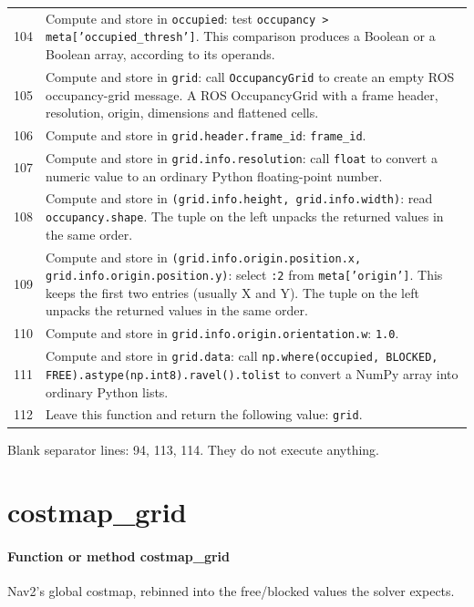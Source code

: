 \documentclass[11pt,a4paper]{book}
\begin{document}
\begin{longtable}{r p{}}
104 & Compute and store in \texttt{occupied}: test \texttt{occupancy > meta['occupied\_thresh']}. This comparison produces a Boolean or a Boolean array, according to its operands.  \\

105 & Compute and store in \texttt{grid}: call \texttt{OccupancyGrid} to create an empty ROS occupancy-grid message. A ROS OccupancyGrid with a frame header, resolution, origin, dimensions and flattened cells. \\

106 & Compute and store in \texttt{grid.header.frame\_id}: \texttt{frame\_id}.  \\

107 & Compute and store in \texttt{grid.info.resolution}: call \texttt{float} to convert a numeric value to an ordinary Python floating-point number.  \\

108 & Compute and store in \texttt{(grid.info.height, grid.info.width)}: read \texttt{occupancy.shape}. The tuple on the left unpacks the returned values in the same order. \\

109 & Compute and store in \texttt{(grid.info.origin.position.x, grid.info.origin.position.y)}: select \texttt{:2} from \texttt{meta['origin']}. This keeps the first two entries (usually X and Y). The tuple on the left unpacks the returned values in the same order. \\

110 & Compute and store in \texttt{grid.info.origin.orientation.w}: \texttt{1.0}.  \\

111 & Compute and store in \texttt{grid.data}: call \texttt{np.where(occupied, BLOCKED, FREE).astype(np.int8).ravel().tolist} to convert a NumPy array into ordinary Python lists.  \\

112 & Leave this function and return the following value: \texttt{grid}. \\

\end{longtable}

Blank separator lines: 94, 113, 114. They do not execute anything.

\section{costmap\_grid}

\paragraph{Function or method costmap\_grid}
Nav2's global costmap, rebinned into the free/blocked values the solver expects.
\end{document}
